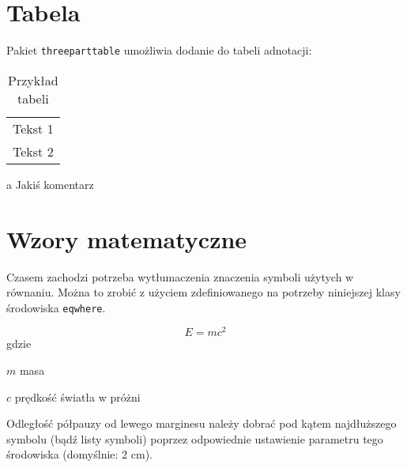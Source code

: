 \section{Tabela}

Pakiet \texttt{threeparttable} umożliwia dodanie do tabeli adnotacji: \\

\begin{table}[h]
	\centering
	
	\begin{threeparttable}
		\caption{Przykład tabeli}
		\label{tab:table_example}
		
		\begin{tabularx}{0.6\textwidth}{C{1}}
			\toprule
			 \\
			\midrule
			Tekst 1 \\
			Tekst 2 \\
			\bottomrule
		\end{tabularx}
		
		\begin{tablenotes}
			\footnotesize
			\item[a] Jakiś komentarz\textellipsis
		\end{tablenotes}
		
	\end{threeparttable}
\end{table}

\section{Wzory matematyczne}

Czasem zachodzi potrzeba wytłumaczenia znaczenia symboli użytych w równaniu. Można to zrobić z użyciem zdefiniowanego na potrzeby niniejszej klasy środowiska \texttt{eqwhere}.

\begin{equation}
E = mc^2
\end{equation}
gdzie
\begin{eqwhere}[2cm]
	\item[$m$] masa
	\item[$c$] prędkość światła w próżni
\end{eqwhere}

Odległość półpauzy od lewego marginesu należy dobrać pod kątem najdłuższego symbolu (bądź listy symboli) poprzez odpowiednie ustawienie parametru tego środowiska (domyślnie: 2 cm).
